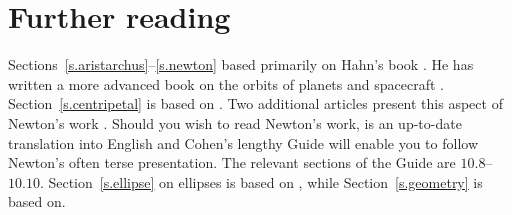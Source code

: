 
\section*{Further reading}

Sections~\ref{s.aristarchus}--\ref{s.newton} based primarily on Hahn's book \cite{hahn-cic}. He has written a more advanced book on the orbits of planets and spacecraft \cite{hahn-orbits}. Section~\ref{s.centripetal} is based on \cite{griffiths}. Two additional articles present this aspect of Newton's work \cite{hauser-lang,stein}. Should you wish to read Newton's work, \cite{newton-cohen} is an up-to-date translation into English and Cohen's lengthy Guide will enable you to follow Newton's often terse presentation. The relevant sections of the Guide are $10.8$--$10.10$. Section~\ref{s.ellipse} on ellipses is based on \cite{wiki-ellipse}, while Section~\ref{s.geometry} is based on\cite{besant}. 



